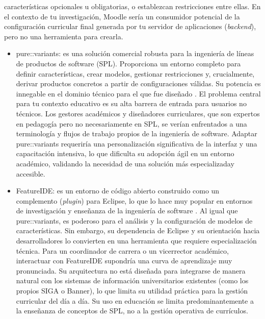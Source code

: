 {{\begin{itemize}
            características opcionales u obligatorias, o establezcan restricciones
            entre ellas. En el contexto de tu investigación, Moodle sería un
            consumidor potencial de la configuración curricular final generada por tu
            servidor de aplicaciones (\textit{backend}), pero no una herramienta para crearla.
        \end{itemize}
        \begin{itemize}
            \item pure::variants: es una solución comercial robusta para la ingeniería de líneas
            de productos de software (\ac{SPL}). Proporciona un entorno completo para definir
            características, crear modelos, gestionar restricciones y, crucialmente, derivar
            productos concretos a partir de configuraciones válidas. Su potencia es
            innegable en el dominio técnico para el que fue diseñado \citep{purevariants2024overview}. El problema central
            para tu contexto educativo es su alta barrera de entrada para usuarios no
            técnicos. Los gestores académicos y diseñadores curriculares, que son
            expertos en pedagogía pero no necesariamente en \ac{SPL}, se verían enfrentados
            a una terminología y flujos de trabajo propios de la ingeniería de software.
            Adaptar pure::variants requeriría una personalización significativa de la
            interfaz y una capacitación intensiva, lo que dificulta su adopción ágil en un
            entorno académico, validando la necesidad de una solución más especializaday accesible.
            \item FeatureIDE: es un entorno de código abierto construido como un complemento (\textit{plugin}) para
            Eclipse, lo que lo hace muy popular en entornos de investigación y enseñanza
            de la ingeniería de software \citep{thum2014featureide}. Al igual que pure::variants, es poderoso para
            el análisis y la configuración de modelos de características. Sin embargo, su
            dependencia de Eclipse y su orientación hacia desarrolladores lo convierten en
            una herramienta que requiere especialización técnica. Para un coordinador de
            carrera o un vicerrector académico, interactuar con FeatureIDE supondría una
            curva de aprendizaje muy pronunciada. Su arquitectura no está diseñada para
            integrarse de manera natural con los sistemas de información universitarios
            existentes (como los propios SIGA o Banner), lo que limita su utilidad práctica
            para la gestión curricular del día a día. Su uso en educación se limita
            predominantemente a la enseñanza de conceptos de \ac{SPL}, no a la gestión
            operativa de currículos.
        \end{itemize}
    }

}
